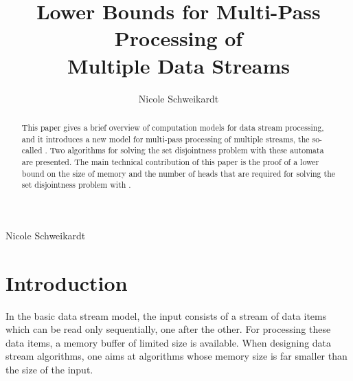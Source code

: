\documentclass[proceedings]{stacs}
\theoremstyle{plain}\newtheorem{satz}[thm]{Satz}
\theoremstyle{definition}\newtheorem{crucial}[thm]{Crucial Definition}
\newcommand{\auta}{\text{mp2s-automata}}
\begin{document}
\title[Lower Bounds for Multi-Pass Processing of Multiple Data Streams]
{Lower Bounds for Multi-Pass Processing of \\ Multiple Data Streams}

\author{Nicole Schweikardt}{Nicole Schweikardt}
\address{Institut f\"ur Informatik, 
  Goethe-Universit\"at Frankfurt am Main, \newline
  Robert-Mayer-Str.\ 11--15, D-60325 Frankfurt am Main, 
  Germany}      



\vspace{-1ex}







\begin{abstract}
  \noindent 
  This paper gives a brief overview of computation models for data stream processing, and
  it introduces a new model for multi-pass processing of
  multiple streams, the so-called \emph{\auta{}}. Two algorithms for solving the 
  set disjointness problem with these automata are presented.
  The main technical contribution of this paper is the proof of a 
  lower bound on the size of memory and the number of heads that are
  required for solving the set disjointness problem with \auta{}.
\end{abstract}

\maketitle






\section{Introduction}\label{section:introduction}


In the basic data stream model, the input consists of a stream of data items 
which can be read only sequentially, one after the other.
For processing these data items, a memory buffer of limited size is available.
When designing data stream algorithms, one aims at 
algorithms whose memory size is far smaller than the size of the input.
\end{document}

